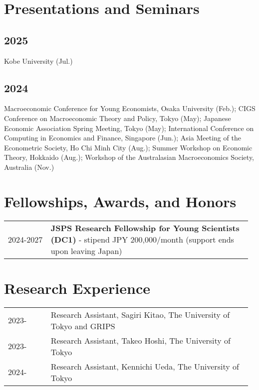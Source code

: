 \documentclass[11pt]{article}
\begin{document}
\section*{Presentations and Seminars}
\subsection*{2025}
Kobe University (Jul.)
\subsection*{2024}
Macroeconomic Conference for Young Economists, Osaka University (Feb.); 
CIGS Conference on Macroeconomic Theory and Policy, Tokyo (May); 
Japanese Economic Association Spring Meeting, Tokyo (May); 
International Conference on Computing in Economics and Finance, Singapore (Jun.); 
Asia Meeting of the Econometric Society, Ho Chi Minh City (Aug.); 
Summer Workshop on Economic Theory, Hokkaido (Aug.); 
Workshop of the Australasian Macroeconomics Society, Australia (Nov.)

\section*{Fellowships, Awards, and Honors}
\begin{tabular}{p{0.17\linewidth} p{0.80\linewidth}}
2024-2027 & \textbf{JSPS Research Fellowship for Young Scientists (DC1)} - stipend JPY 200,000/month (support ends upon leaving Japan)\\
\end{tabular}

\section*{Research Experience}
\begin{tabular}{p{0.17\linewidth} p{0.80\linewidth}}
2023- & Research Assistant, Sagiri Kitao, The University of Tokyo and GRIPS\\[2pt]
2023- & Research Assistant, Takeo Hoshi, The University of Tokyo\\[2pt]
2024- & Research Assistant, Kennichi Ueda, The University of Tokyo\\[2pt]
\end{tabular}
\end{document}
